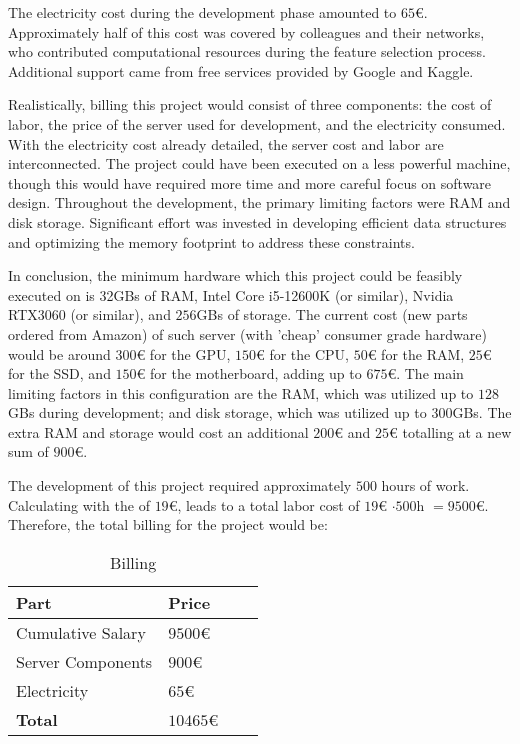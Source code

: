 The electricity cost during the development phase amounted to $65$€. Approximately half of this cost was covered by colleagues and their networks, who contributed computational resources during the feature selection process. Additional support came from free services provided by Google and Kaggle.\par
Realistically, billing this project would consist of three components: the cost of labor, the price of the server used for development, and the electricity consumed. With the electricity cost already detailed, the server cost and labor are interconnected. The project could have been executed on a less powerful machine, though this would have required more time and more careful focus on software design. Throughout the development, the primary limiting factors were RAM and disk storage. Significant effort was invested in developing efficient data structures and optimizing the memory footprint to address these constraints.\par
In conclusion, the minimum hardware which this project could be feasibly executed on is 32GBs of RAM, Intel Core i5-12600K (or similar), Nvidia RTX3060 (or similar), and $256$GBs of storage. The current cost (new parts ordered from Amazon) of such server (with 'cheap' consumer grade hardware) would be around $300$€ for the GPU, $150$€ for the CPU, $50$€ for the RAM, $25$€ for the SSD, and $150$€ for the motherboard, adding up to $675$€. The main limiting factors in this configuration are the RAM, which was utilized up to $128$GBs during development; and disk storage, which was utilized up to $300$GBs. The extra RAM and storage would cost an additional $200$€ and $25$€ totalling at a new sum of $900$€.\par
The development of this project required approximately $500$ hours of work. Calculating with the  of $19$€, leads to a total labor cost of $19$€ $ \cdot 500$h $ = 9500$€. Therefore, the total billing for the project would be:
\begin{table}[H]
\centering
\begin{tabular}{|l|l|l|l|}
\hline
\textbf{Part} & \textbf{Price} \\ \hline
Cumulative Salary & $9500$€ \\ \hline
Server Components & $900$€ \\ \hline
Electricity & $65$€ \\ \hline
\textbf{Total} & $10465$€ \\ \hline
\end{tabular}
\caption{Billing}
\label{tab:sus2}
\end{table}


